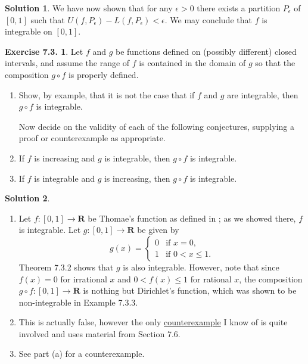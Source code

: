 \documentclass[12pt]{article}
\theoremstyle{definition}
\theoremstyle{exercise}
\newtheorem{exercise}{Exercise 7.3.}
\theoremstyle{solution}
\newtheorem*{solution}{Solution}
\newcommand{\R}{\mathbf{R}}
\begin{document}
\begin{solution}
    We have now shown that for any \( \epsilon > 0 \) there exists a partition \( P_{\epsilon} \) of \( [0, 1] \) such that \( U(f, P_{\epsilon}) - L(f, P_{\epsilon}) < \epsilon \). We may conclude that \( f \) is integrable on \( [0, 1] \).
\end{solution}

\begin{exercise}
\label{ex:4}
    Let \( f \) and \( g \) be functions defined on (possibly different) closed intervals, and assume the range of \( f \) is contained in the domain of \( g \) so that the composition \( g \circ f \) is properly defined.
    \begin{enumerate}
        \item Show, by example, that it is not the case that if \( f \) and \( g \) are integrable, then \( g \circ f \) is integrable.

        Now decide on the validity of each of the following conjectures, supplying a proof or counterexample as appropriate.

        \item If \( f \) is increasing and \( g \) is integrable, then \( g \circ f \) is integrable.

        \item If \( f \) is integrable and \( g \) is increasing, then \( g \circ f \) is integrable.
    \end{enumerate}
\end{exercise}

\begin{solution}
    \begin{enumerate}
        \item Let \( f : [0, 1] \to \R \) be Thomae's function as defined in ; as we showed there, \( f \) is integrable. Let \( g : [0, 1] \to \R \) be given by
        \[
            g(x) = \begin{cases}
                0 & \text{if } x = 0, \\
                1 & \text{if } 0 < x \leq 1.
            \end{cases}
        \]
        Theorem 7.3.2 shows that \( g \) is also integrable. However, note that since \( f(x) = 0 \) for irrational \( x \) and \( 0 < f(x) \leq 1 \) for rational \( x \), the composition \( g \circ f : [0, 1] \to \R \) is nothing but Dirichlet's function, which was shown to be non-integrable in Example 7.3.3.

        \item This is actually false, however the only \href{https://math.stackexchange.com/questions/1833028/if-g-is-riemann-integrable-in-a-closed-interval-and-f-is-a-increasing-functi/1834357#1834357}{counterexample} I know of is quite involved and uses material from Section 7.6.

        \item See part (a) for a counterexample.
    \end{enumerate}
\end{solution}
\end{document}
